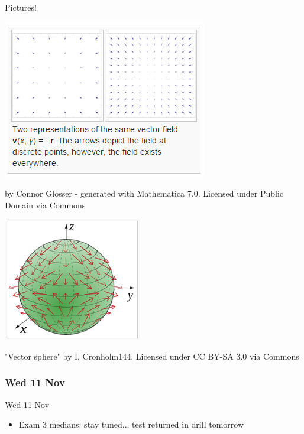 \documentclass[12pt]{beamer}
\theoremstyle{plain}
\theoremstyle{definition}
\begin{document}
%
\begin{frame}[allowframebreaks]{\small Pictures!}\footnotesize
\begin{center}
\includegraphics[scale=0.7]{14-1vField}
\end{center}

{\tiny by Connor Glosser - generated with Mathematica 7.0. 
Licensed under Public Domain via Commons} %
%
\framebreak
\begin{center}
\includegraphics[scale=1.0]{14-1vectorSphere}
\end{center}

{\tiny "Vector sphere" by I, Cronholm144. Licensed under CC BY-SA 3.0 via Commons}%
\end{frame}

\subsubsection{Wed 11 Nov}
\begin{frame}{Wed 11 Nov}%
\begin{itemize}
\item Exam 3 medians: stay tuned... test returned in drill tomorrow
\end{itemize}
\end{frame}
\end{document}
